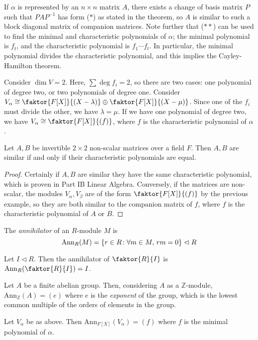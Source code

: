 \begin{remark}
	If \( \alpha \) is represented by an \( n \times n \) matrix \( A \), there exists a change of basis matrix \( P \) such that \( PAP^{-1} \) has form (\(\ast\)) as stated in the theorem, so \( A \) is similar to such a block diagonal matrix of companion matrices.
	Note further that (\(\ast\ast\)) can be used to find the minimal and characteristic polynomials of \( \alpha \); the minimal polynomial is \( f_t \), and the characteristic polynomial is \( f_1 \cdots f_t \).
	In particular, the minimal polynomial divides the characteristic polynomial, and this implies the Cayley-Hamilton theorem.
\end{remark}
\begin{example}
	Consider \( \dim V = 2 \).
	Here, \( \sum \deg f_i = 2 \), so there are two cases: one polynomial of degree two, or two polynomials of degree one.
	Consider \( V_\alpha \cong \faktor{F[X]}{(X-\lambda)} \oplus \faktor{F[X]}{(X-\mu)} \).
	Since one of the \( f_i \) must divide the other, we have \( \lambda = \mu \).
	If we have one polynomial of degree two, we have \( V_\alpha \cong \faktor{F[X]}{(f)} \), where \( f \) is the characteristic polynomial of \( \alpha \).
\end{example}
\begin{corollary}
	Let \( A, B \) be invertible \( 2 \times 2 \) non-scalar matrices over a field \( F \).
	Then \( A, B \) are similar if and only if their characteristic polynomials are equal.
\end{corollary}
\begin{proof}
	Certainly if \( A, B \) are similar they have the same characteristic polynomial, which is proven in Part IB Linear Algebra.
	Conversely, if the matrices are non-scalar, the modules \( V_\alpha, V_\beta \) are of the form \( \faktor{F[X]}{(f)} \) by the previous example, so they are both similar to the companion matrix of \( f \), where \( f \) is the characteristic polynomial of \( A \) or \( B \).
\end{proof}
\begin{definition}
	The \textit{annihilator} of an \( R \)-module \( M \) is
	\[
		\mathrm{Ann}_R(M) = \qty{r \in R \colon \forall m \in M,\, rm = 0} \vartriangleleft R
	\]
\end{definition}
\begin{example}
	Let \( I \vartriangleleft R \).
	Then the annihilator of \( \faktor{R}{I} \) is \( \mathrm{Ann}_R\qty(\faktor{R}{I}) = I \).

	Let \( A \) be a finite abelian group.
	Then, considering \( A \) as a \( \mathbb Z \)-module, \( \mathrm{Ann}_{\mathbb Z}(A) = (e) \) where \( e \) is the \textit{exponent} of the group, which is the lowest common multiple of the orders of elements in the group.

	Let \( V_\alpha \) be as above.
	Then \( \mathrm{Ann}_{F[X]}(V_\alpha) = (f) \) where \( f \) is the minimal polynomial of \( \alpha \).
\end{example}


